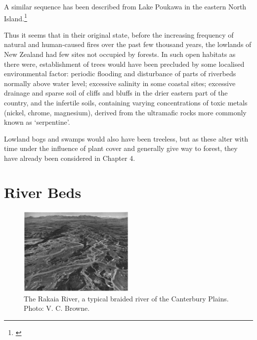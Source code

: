 A similar sequence has been described from Lake Poukawa in the eastern North Island.\footnote{\cite{mcglone1978forest}}

Thus it seems that in their original state, before the increasing frequency of natural and human-caused fires over the past few thousand years, the lowlands of New Zealand had few sites not occupied by forests.
In such open habitats as there were, establishment of trees would have been precluded by some localised environmental factor: periodic flooding and disturbance of parts of riverbeds normally above water level; excessive salinity in some coastal sites; excessive drainage and sparse soil of cliffs and bluffs in the drier eastern part of the country, and the infertile soils, containing varying concentrations of toxic metals (nickel, chrome, magnesium), derived from the ultramafic rocks more commonly known as `serpentine'.

Lowland bogs and swamps would also have been treeless, but as these alter with time under the influence of plant cover and generally give way to forest, they have already been considered in Chapter 4.

\section{River Beds}

\begin{figure}
	\includegraphics[width=0.5\textwidth]{graphics/figure87rakaia.jpg}
	\centering
	\caption[The Rakaia River]{The Rakaia River, a typical braided river of the Canterbury Plains.
	Photo: V. C. Browne.}%
	\label{fig:87rakaia}
\end{figure}

